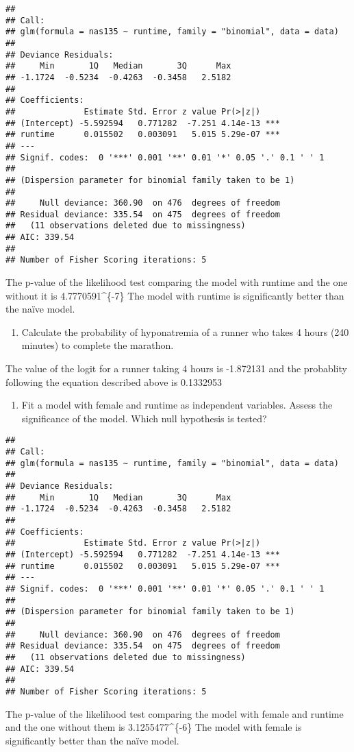 \documentclass[]{article}
\begin{document}
\begin{verbatim}
## 
## Call:
## glm(formula = nas135 ~ runtime, family = "binomial", data = data)
## 
## Deviance Residuals: 
##     Min       1Q   Median       3Q      Max  
## -1.1724  -0.5234  -0.4263  -0.3458   2.5182  
## 
## Coefficients:
##              Estimate Std. Error z value Pr(>|z|)    
## (Intercept) -5.592594   0.771282  -7.251 4.14e-13 ***
## runtime      0.015502   0.003091   5.015 5.29e-07 ***
## ---
## Signif. codes:  0 '***' 0.001 '**' 0.01 '*' 0.05 '.' 0.1 ' ' 1
## 
## (Dispersion parameter for binomial family taken to be 1)
## 
##     Null deviance: 360.90  on 476  degrees of freedom
## Residual deviance: 335.54  on 475  degrees of freedom
##   (11 observations deleted due to missingness)
## AIC: 339.54
## 
## Number of Fisher Scoring iterations: 5
\end{verbatim}

The p-value of the likelihood test comparing the model with runtime and
the one without it is 4.7770591\^{}\{-7\} The model with
runtime is significantly better than the naïve model.

\begin{enumerate}
\def\labelenumi{\alph{enumi}.}
\setcounter{enumi}{7}
\itemsep1pt\parskip0pt
\item
  Calculate the probability of hyponatremia of a runner who takes 4
  hours (240 minutes) to complete the marathon.
\end{enumerate}

The value of the logit for a runner taking 4 hours is -1.872131 and the
probablity following the equation described above is 0.1332953

\begin{enumerate}
\def\labelenumi{\roman{enumi}.}
\itemsep1pt\parskip0pt
\item
  Fit a model with female and runtime as independent variables. Assess
  the significance of the model. Which null hypothesis is tested?
\end{enumerate}

\begin{verbatim}
## 
## Call:
## glm(formula = nas135 ~ runtime, family = "binomial", data = data)
## 
## Deviance Residuals: 
##     Min       1Q   Median       3Q      Max  
## -1.1724  -0.5234  -0.4263  -0.3458   2.5182  
## 
## Coefficients:
##              Estimate Std. Error z value Pr(>|z|)    
## (Intercept) -5.592594   0.771282  -7.251 4.14e-13 ***
## runtime      0.015502   0.003091   5.015 5.29e-07 ***
## ---
## Signif. codes:  0 '***' 0.001 '**' 0.01 '*' 0.05 '.' 0.1 ' ' 1
## 
## (Dispersion parameter for binomial family taken to be 1)
## 
##     Null deviance: 360.90  on 476  degrees of freedom
## Residual deviance: 335.54  on 475  degrees of freedom
##   (11 observations deleted due to missingness)
## AIC: 339.54
## 
## Number of Fisher Scoring iterations: 5
\end{verbatim}

The p-value of the likelihood test comparing the model with female and
runtime and the one without them is 3.1255477\^{}\{-6\} The
model with female is significantly better than the naïve model.
\end{document}
